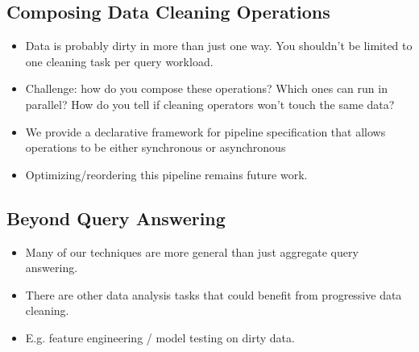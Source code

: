 \subsection{Composing Data Cleaning Operations}
\begin{itemize}
\item Data is probably dirty in more than just one way. You shouldn't be limited to one cleaning task per query workload.
\item Challenge: how do you compose these operations? Which ones can run in parallel? How do you tell if cleaning operators won't touch the same data?
\item We provide a declarative framework for pipeline specification that allows operations to be either synchronous or asynchronous
\item Optimizing/reordering this pipeline remains future work.
\end{itemize}

\subsection{Beyond Query Answering}
\begin{itemize}
\item Many of our techniques are more general than just aggregate query answering.
\item There are other data analysis tasks that could benefit from progressive data cleaning.
\item E.g. feature engineering / model testing on dirty data.
\end{itemize}
